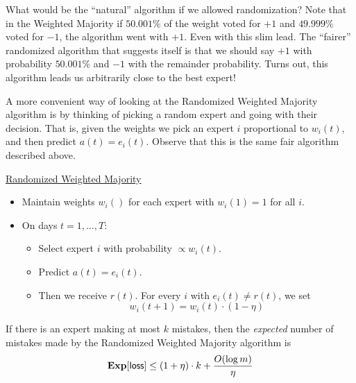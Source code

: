 \documentclass[11pt]{article}
\begin{document}
What would be the ``natural'' algorithm if we allowed randomization? Note that in the {\sc Weighted Majority} if $50.001\%$ of the weight voted for $+1$ and $49.999\%$ voted for $-1$, the algorithm went with $+1$. Even with this slim lead. The ``fairer'' randomized algorithm that suggests itself is that we should say $+1$ with probability $50.001\%$ and $-1$ with the remainder probability. 
Turns out, this algorithm leads us arbitrarily close to the best expert!

A more convenient way of looking at the {\sc Randomized Weighted Majority} algorithm is by thinking of picking a random expert and going with their decision. That is, given the weights we pick an expert $i$ proportional to $w_i(t)$, and then predict $a(t) = e_i(t)$. Observe that this is the same fair algorithm described above. 

\begin{mdframed}[backgroundcolor=blue!05,topline=false,bottomline=false,leftline=false,rightline=false] 
	\underline{\sc Randomized Weighted Majority}
	\begin{itemize}
		\item Maintain weights $w_i()$ for each expert with $w_i(1) = 1$ for all $i$.
		\item On days $t=1,\ldots, T$:
		\begin{itemize}
			\item Select expert $i$ with probability $\propto w_i(t)$.
			\item Predict $a(t) = e_i(t)$.
			\item Then we receive $r(t)$. For every $i$ with $e_i(t) \neq r(t)$, we set
			\begin{equation}
			\label{eq:halving}
			w_i(t+1) = w_i(t)\cdot (1 - \eta)
			\end{equation}
			
		\end{itemize} 
	\end{itemize}
\end{mdframed}

\begin{theorem}
	If there is an expert making at most $k$ mistakes, then the {\em expected} number of mistakes made by the {\sc Randomized Weighted Majority} algorithm is 
	\[
	\mathbf{Exp}[\mathsf{loss}] \leq (1 + \eta)\cdot k + \frac{O(\log m)}{\eta}
	\]
\end{theorem}
\end{document}
